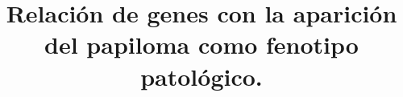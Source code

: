 \documentclass{bmcart}
\begin{document}
	\begin{frontmatter}
	
		\begin{fmbox}
			
			
			\title{Relación de genes con la aparición del papiloma como fenotipo patológico.}
			
			
			\author[
			  addressref={aff1},                   %
			  email={meixin3@uma.es}   %
			]{ } %
			\author[
			  addressref={aff1},
			  email={raulcastrov@uma.es}
			]{ }
				\author[
			addressref={aff1},
			email={mariajose.hidalgo@uma.es}
			]{ }
				\author[
			addressref={aff1},
			email={francisco.rodriguezcordoba@uma.es}
			]{ }
				\author[
			addressref={aff1},
			corref={aff1},                       %
			email={mariavida262001@uma.es}
			]{ }
			
			
			\address[id=aff1]{%
			  ,             %
			  ,          %
			  ,                              %
			}
		
		\end{fmbox}%
		
		\begin{abstractbox}
		
			\begin{abstract} %
			

\end{abstract}
\end{abstractbox}
\end{frontmatter}
\end{document}
